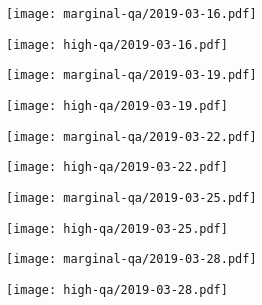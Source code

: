 \documentclass{article}
\begin{document}
\begin{figure}[H]
	\ContinuedFloat
	\centering
	\begin{subfigure}{0.48\linewidth}
		\texttt{[image: marginal-qa/2019-03-16.pdf]}
	\end{subfigure}
	\begin{subfigure}{0.48\linewidth}
		\texttt{[image: high-qa/2019-03-16.pdf]}
	\end{subfigure}
	\begin{subfigure}{0.48\linewidth}
		\texttt{[image: marginal-qa/2019-03-19.pdf]}
	\end{subfigure}
	\begin{subfigure}{0.48\linewidth}
		\texttt{[image: high-qa/2019-03-19.pdf]}
	\end{subfigure}
	\begin{subfigure}{0.48\linewidth}
		\texttt{[image: marginal-qa/2019-03-22.pdf]}
	\end{subfigure}
	\begin{subfigure}{0.48\linewidth}
		\texttt{[image: high-qa/2019-03-22.pdf]}
	\end{subfigure}
	\begin{subfigure}{0.48\linewidth}
		\texttt{[image: marginal-qa/2019-03-25.pdf]}
	\end{subfigure}
	\begin{subfigure}{0.48\linewidth}
		\texttt{[image: high-qa/2019-03-25.pdf]}
	\end{subfigure}
	\begin{subfigure}{0.48\linewidth}
		\texttt{[image: marginal-qa/2019-03-28.pdf]}
	\end{subfigure}
	\begin{subfigure}{0.48\linewidth}
		\texttt{[image: high-qa/2019-03-28.pdf]}
	\end{subfigure}
\end{figure}
\end{document}
